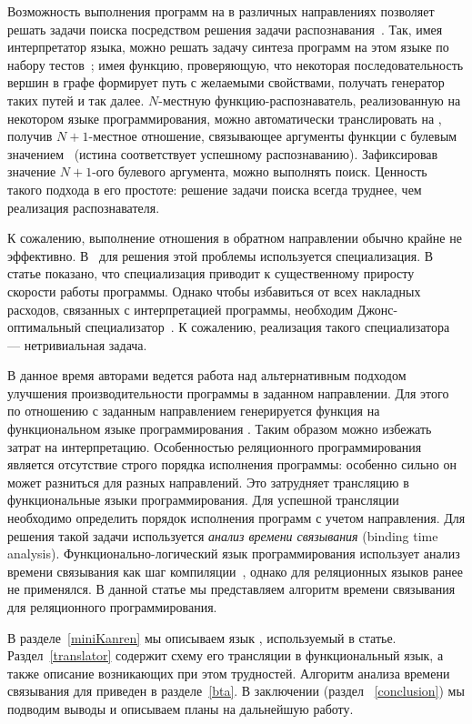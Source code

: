 \documentclass[conference]{IEEEtran}
\begin{document}
Возможность выполнения программ на \miniKanren{} в различных направлениях позволяет решать задачи поиска посредством решения задачи распознавания~\cite{lozov2019relational}.
Так, имея интерпретатор языка, можно решать задачу синтеза программ на этом языке по набору тестов~\cite{byrd2017unified}; имея функцию, проверяющую, что некоторая последовательность вершин в графе формирует путь с желаемыми свойствами, получать генератор таких путей и так далее. 
$N$-местную функцию-распознаватель, реализованную на некотором языке программирования, можно автоматически транслировать на \miniKanren{}, получив $N+1$-местное отношение, связывающее аргументы функции с булевым значением~\cite{lozov2019relational} (истина соответствует успешному распознаванию). 
Зафиксировав значение $N+1$-ого булевого аргумента, можно выполнять поиск. 
Ценность такого подхода в его простоте: решение задачи поиска всегда труднее, чем реализация распознавателя. 

К сожалению, выполнение отношения в обратном направлении обычно крайне не эффективно. 
В~\cite{lozov2019relational} для решения этой проблемы используется специализация. 
В статье показано, что специализация приводит к существенному приросту скорости работы программы.
Однако чтобы избавиться от всех накладных расходов, связанных с интерпретацией программы, необходим Джонс-оптимальный специализатор~\cite{jones1993partial}. 
К сожалению, реализация такого специализатора --- нетривиальная задача.

В данное время авторами ведется работа над альтернативным подходом улучшения производительности программы в заданном направлении. 
Для этого по отношению с заданным направлением генерируется функция на функциональном языке программирования \haskell{}. 
Таким образом можно избежать затрат на интерпретацию. 
Особенностью реляционного программирования является отсутствие строго порядка исполнения программы: особенно сильно он может разниться для разных направлений.
Это затрудняет трансляцию в функциональные языки программирования. 
Для успешной трансляции необходимо определить порядок исполнения программ с учетом направления. 
Для решения такой задачи используется \emph{анализ времени связывания} (binding time analysis). 
Функционально-логический язык программирования \mercury{} использует анализ времени связывания как шаг компиляции~\cite{vanhoof2004binding}, однако для реляционных языков ранее не применялся.
В данной статье мы представляем алгоритм времени связывания для реляционного программирования. 

В разделе~\ref{miniKanren} мы описываем язык \miniKanren{}, используемый в статье.
Раздел~\ref{translator} содержит схему его трансляции в функциональный язык, а также описание возникающих при этом трудностей.
Алгоритм анализа времени связывания для \miniKanren{} приведен в разделе~\ref{bta}. 
В заключении (раздел ~\ref{conclusion}) мы подводим выводы и описываем планы на дальнейшую работу. 
\end{document}
